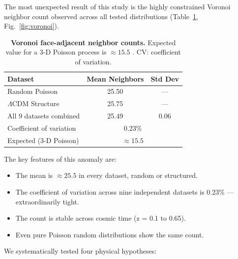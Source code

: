 \documentclass[12pt,a4paper]{article}
\begin{document}
The most unexpected result of this study is the highly constrained Voronoi
neighbor count observed across all tested distributions
(Table~\ref{tab:voronoi}, Fig.~\ref{fig:voronoi}).

\begin{table}[htbp]
  \centering
  \caption{\textbf{Voronoi face-adjacent neighbor counts.}  Expected value for a
    3-D Poisson process is $\approx 15.5$ \citep{meijering1953interface}.  CV:
    coefficient of variation.}
  \label{tab:voronoi}
  \renewcommand{\arraystretch}{1.25}
  \begin{tabular}{lcc}
    \toprule
    Dataset & Mean Neighbors & Std Dev\\
    \midrule
    Random Poisson         & 25.50 & ---\\
    $\Lambda$CDM Structure & 25.75 & ---\\
    All 9 datasets combined & 25.49 & 0.06\\
    Coefficient of variation & \multicolumn{2}{c}{0.23\%}\\
    \midrule
    Expected (3-D Poisson) & \multicolumn{2}{c}{$\approx 15.5$}\\
    \bottomrule
  \end{tabular}
\end{table}

The key features of this anomaly are:

\begin{itemize}
  \item The mean is $\approx 25.5$ in every dataset, random or structured.
  \item The coefficient of variation across nine independent datasets is 0.23\%
        --- extraordinarily tight.
  \item The count is stable across cosmic time (z = 0.1 to 0.65).
  \item Even pure Poisson random distributions show the same count.
\end{itemize}

We systematically tested four physical hypotheses:
\end{document}
